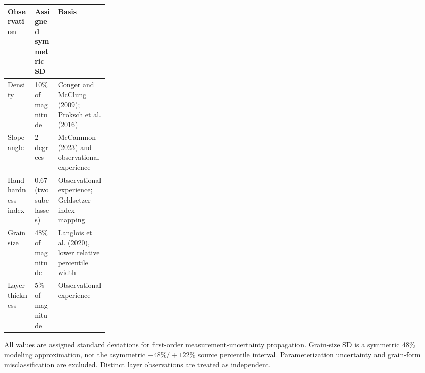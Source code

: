 \begin{tabularx}{\linewidth}{@{}lp{0.23\linewidth}X@{}}
\toprule
Observation & Assigned symmetric SD & Basis \\
\midrule
Density & 10\% of magnitude & Conger and McClung (2009); Proksch et al. (2016) \\
Slope angle & 2 degrees & McCammon (2023) and observational experience \\
Hand-hardness index & 0.67 (two subclasses) & Observational experience; Geldsetzer index mapping \\
Grain size & 48\% of magnitude & Langlois et al. (2020), lower relative percentile width \\
Layer thickness & 5\% of magnitude & Observational experience \\
\bottomrule
\end{tabularx}

\smallskip
{\footnotesize All values are assigned standard deviations for first-order
measurement-uncertainty propagation. Grain-size SD is a symmetric 48\% modeling
approximation, not the asymmetric $-48\%/+122\%$ source percentile interval.
Parameterization uncertainty and grain-form misclassification are excluded.
Distinct layer observations are treated as independent.}
